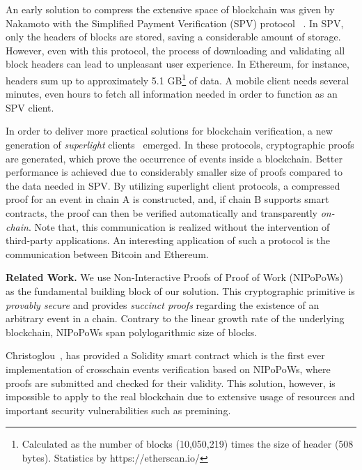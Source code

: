 An early solution to compress the extensive space of blockchain was given by
Nakamoto with the Simplified Payment Verification (SPV) protocol
~\cite{nakamoto}. In SPV, only the headers of blocks are stored, saving a
considerable amount of storage.  However, even with this protocol, the process
of downloading and validating all block headers can lead to unpleasant user
experience. In Ethereum, for instance, headers sum up to approximately 5.1
GB\footnote{Calculated as the number of blocks (10,050,219) times the size of
header (508 bytes). Statistics by https://etherscan.io/} of data. A mobile
client needs several minutes, even hours to fetch all information needed in
order to function as an SPV client.

In order to deliver more practical solutions for blockchain verification, a new
generation of \emph{superlight}
clients~\cite{popow,nipopows,compactsuperblocks, flyclient} emerged. In these
protocols, cryptographic proofs are generated, which prove the occurrence of
events inside a blockchain. Better performance is achieved due to considerably
smaller size of proofs compared to the data needed in SPV. By utilizing
superlight client protocols, a compressed proof for an event in chain A is
constructed, and, if chain B supports smart contracts, the proof can then be
verified automatically and transparently \emph{on-chain}.  Note that, this
communication is realized without the intervention of third-party applications.
An interesting application of such a protocol is the communication between
Bitcoin and Ethereum.

\noindent

\textbf{Related Work.} We use Non-Interactive Proofs of Proof of Work
(NIPoPoWs)~\cite{nipopows} as the fundamental building block of our solution.
This cryptographic primitive is \emph{provably secure} and provides
\emph{succinct proofs} regarding the existence of an arbitrary event in a
chain. Contrary to the linear growth rate of the underlying blockchain,
NIPoPoWs span polylogarithmic size of blocks.

Christoglou~\cite{gglou}, has provided a Solidity smart contract which is the first
ever implementation of crosschain events verification based on NIPoPoWs, where
proofs are submitted and checked for their validity. This solution, however, is
impossible to apply to the real blockchain due to extensive usage of resources
and important security vulnerabilities such as premining.

\noindent

